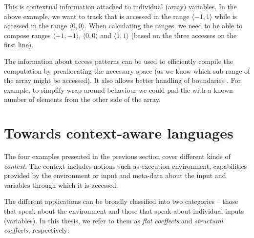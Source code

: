 This is contextual information attached to individual (array) variables.
In the above example, we want to track that  is accessed in the range $\langle-1, 1 \rangle$
while  is accessed in the range $\langle 0, 0 \rangle$. When calculating the ranges,
we need to be able to compose ranges $\langle-1,-1 \rangle$, $\langle 0,0 \rangle$ and $\langle 1,1 \rangle$
(based on the three accesses on the first line).

The information about access patterns can be used to efficiently compile the computation
by preallocating the necessary space (as we know which sub-range of the array might be accessed).
It also allows better handling of boundaries \cite{app-stencil-dsl}. For example, to simplify 
wrap-around behaviour we could pad the  with a known number of elements from the 
other side of the array.


%
%


\section{Towards context-aware languages}

The four examples presented in the previous section cover different kinds of \emph{context}.
The context includes notions such as execution environment, capabilities provided by the 
environment or input and meta-data about the input and variables through which it is accessed.

The different applications can be broadly classified into two categories -- those that
speak about the environment and those that speak about individual inputs (variables). In this
thesis, we refer to them as \emph{flat coeffects} and \emph{structural coeffects}, respectively:

